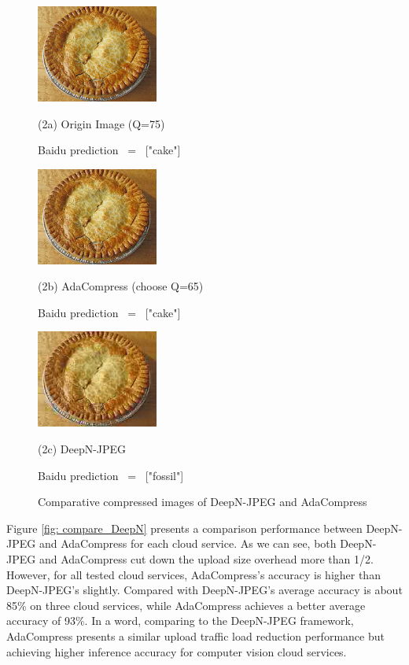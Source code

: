 \begin{figure}[htbp]
    \vfill
    \vspace{0.4cm}
    
    \begin{minipage}{0.3\linewidth}
        \centerline{\includegraphics[width=4.0cm,trim=0 0 0 0,clip ]{figures/cake_q75.jpeg}}
        \centerline{(2a) Origin Image (Q=75)}
        \centerline{Baidu prediction \ = \ ["cake"]}
    \end{minipage}
    \hfill
    \begin{minipage}{0.2\linewidth}
        \centerline{\includegraphics[width=4.0cm,trim=0 0 0 0,clip ]{figures/cake_q65.jpeg}}
        \centerline{(2b) AdaCompress (choose Q=65)}
        \centerline{Baidu prediction \ = \ ["cake"]}
    \end{minipage}
    \hfill
    \begin{minipage}{0.3\linewidth}
        \centerline{\includegraphics[width=4.0cm,trim=0 0 0 0,clip ]{figures/cake_deepn.jpeg}}
        \centerline{(2c) DeepN-JPEG}
        \centerline{Baidu prediction \ = \ ["fossil"]}
    \end{minipage}
    \vspace{0.2cm}
    \caption{Comparative compressed images of DeepN-JPEG and AdaCompress}
    \label{fig: compare_image}
\end{figure}

Figure \ref{fig: compare_DeepN} presents a comparison performance between DeepN-JPEG and AdaCompress for each cloud service. As we can see, both DeepN-JPEG and AdaCompress cut down the upload size overhead more than 1/2. However, for all tested cloud services, AdaCompress's accuracy is higher than DeepN-JPEG's slightly. Compared with DeepN-JPEG's average accuracy is about 85\% on three cloud services, while AdaCompress achieves a better average accuracy of 93\%. In a word, comparing to the DeepN-JPEG framework, AdaCompress presents a similar upload traffic load reduction performance but achieving higher inference accuracy for computer vision cloud services.

